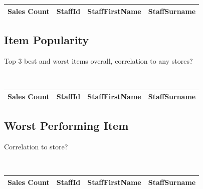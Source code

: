 \documentclass{article}
\begin{document}
            \begin{table}[H]
                \centering
                \begin{tabular}{|l|l|l|l|}
                \hline
                Sales Count & StaffId & StaffFirstName & StaffSurname \\ \hline
                \end{tabular}
                \end{table}

            \subsection{Item Popularity}
                Top 3 best and worst items overall, correlation to any stores?

                \begin{lstlisting}
                   
                \end{lstlisting}

                \begin{table}[H]
                    \centering
                    \begin{tabular}{|l|l|l|l|}
                    \hline
                    Sales Count & StaffId & StaffFirstName & StaffSurname \\ \hline
                    \end{tabular}
                    \end{table}

            \subsection{Worst Performing Item}
                Correlation to store?

                \begin{lstlisting}
                    
                \end{lstlisting}

                \begin{table}[H]
                    \centering
                    \begin{tabular}{|l|l|l|l|}
                    \hline
                    Sales Count & StaffId & StaffFirstName & StaffSurname \\ \hline
                    \end{tabular}
                    \end{table}
\end{document}
